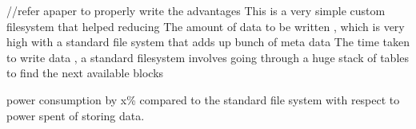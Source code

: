 //refer apaper to properly write the advantages 
This is a very simple custom filesystem that helped reducing  
The amount of data to be written , which is very high with a standard file system that adds up bunch of meta data 
The time taken to write data , a standard filesystem involves going through a huge stack of tables to find the next available blocks  

power consumption by x\%  compared to the standard file system with respect to power spent of storing data. 